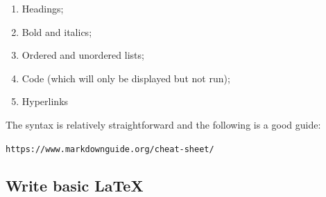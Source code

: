 \begin{enumerate}

\item 

Headings;

\item 

Bold and italics;

\item 

Ordered and unordered lists;

\item 

Code (which will only be displayed but not run);

\item 

Hyperlinks

\end{enumerate}


The syntax is relatively straightforward and the following is a good guide:


\texttt{https://www.markdownguide.org/cheat-sheet/}


\subsection{Write basic LaTeX}

